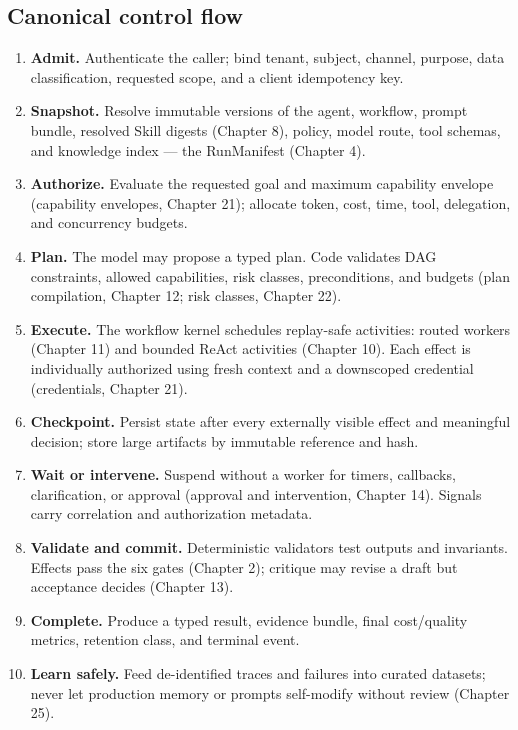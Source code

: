 \subsection{Canonical control flow}

\begin{enumerate}

\item \textbf{Admit.} Authenticate the caller; bind tenant, subject, channel, purpose, data classification, requested scope, and a client idempotency key.

\item \textbf{Snapshot.} Resolve immutable versions of the agent, workflow, prompt bundle, resolved Skill digests (Chapter 8), policy, model route, tool schemas, and knowledge index — the RunManifest (Chapter 4).

\item \textbf{Authorize.} Evaluate the requested goal and maximum capability envelope (capability envelopes, Chapter 21); allocate token, cost, time, tool, delegation, and concurrency budgets.

\item \textbf{Plan.} The model may propose a typed plan. Code validates DAG constraints, allowed capabilities, risk classes, preconditions, and budgets (plan compilation, Chapter 12; risk classes, Chapter 22).

\item \textbf{Execute.} The workflow kernel schedules replay-safe activities: routed workers (Chapter 11) and bounded ReAct activities (Chapter 10). Each effect is individually authorized using fresh context and a downscoped credential (credentials, Chapter 21).

\item \textbf{Checkpoint.} Persist state after every externally visible effect and meaningful decision; store large artifacts by immutable reference and hash.

\item \textbf{Wait or intervene.} Suspend without a worker for timers, callbacks, clarification, or approval (approval and intervention, Chapter 14). Signals carry correlation and authorization metadata.

\item \textbf{Validate and commit.} Deterministic validators test outputs and invariants. Effects pass the six gates (Chapter 2); critique may revise a draft but acceptance decides (Chapter 13).

\item \textbf{Complete.} Produce a typed result, evidence bundle, final cost/quality metrics, retention class, and terminal event.

\item \textbf{Learn safely.} Feed de-identified traces and failures into curated datasets; never let production memory or prompts self-modify without review (Chapter 25).

\end{enumerate}

